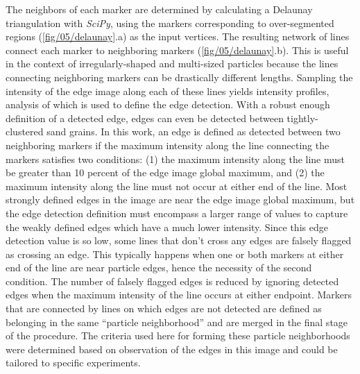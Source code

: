 The neighbors of each marker are determined by calculating a
Delaunay triangulation with \textit{SciPy}, using the markers
corresponding to over-segmented regions (\ref{fig/05/delaunay}.a)
as the input vertices. The resulting
network of lines connect each marker to neighboring markers
(\ref{fig/05/delaunay}.b). This is useful in the
context of irregularly-shaped and multi-sized particles because the lines
connecting neighboring markers can be drastically different lengths.
Sampling the intensity of the edge image along each of these lines yields
intensity profiles, analysis of which is used to define the edge
detection. With a robust enough definition of a detected edge, edges can
even be detected between tightly-clustered sand grains. In this work,
an edge is defined as detected between two neighboring markers if the
maximum intensity along the line connecting the markers satisfies two
conditions: (1) the maximum intensity along the line must be greater than
10 percent of the edge image global maximum, and (2) the maximum
intensity along the line must not occur at either end of the line.
Most strongly defined
edges in the image are near the edge image global maximum, but the edge
detection definition must encompass a larger range of values to capture
the weakly defined edges which have a much lower intensity. Since this
edge detection value is so low, some lines that don't cross any edges are
falsely flagged as crossing an edge. This typically happens when one or
both markers at either end of the line are near particle edges, hence
the necessity of the second condition. The number
of falsely flagged edges is reduced by ignoring detected edges when the
maximum intensity of the line occurs at either endpoint. Markers that are
connected by lines on which edges are not detected are defined as
belonging in the same ``particle neighborhood'' and are merged in the
final stage of the procedure. The criteria used here for forming these
particle neighborhoods were
determined based on observation of the edges in this image and could be
tailored to specific experiments.

